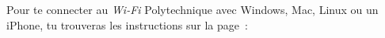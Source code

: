 Pour te connecter au \emph{Wi-Fi} Polytechnique avec Windows, Mac, Linux ou un iPhone, tu trouveras les instructions sur la page~:
\begin{center}
\end{center}


%
%






